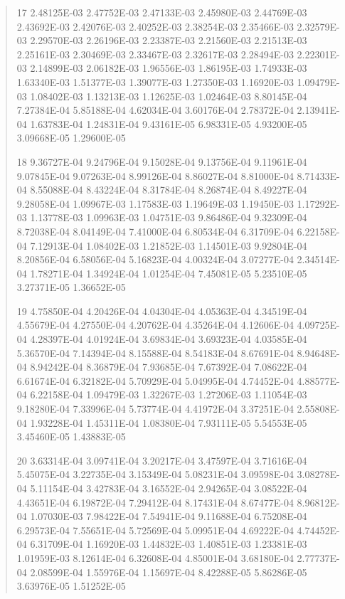 \documentclass[letterpaper,10pt,english]{sphinxmanual}
\begin{document}
\begin{quote}
\begin{DUlineblock}{0em}
\item[] 17   2.48125E-03  2.47752E-03  2.47133E-03  2.45980E-03  2.44769E-03  2.43692E-03  2.42076E-03  2.40252E-03  2.38254E-03  2.35466E-03  2.32579E-03  2.29570E-03  2.26196E-03  2.23387E-03  2.21560E-03  2.21513E-03  2.25161E-03  2.30469E-03  2.33467E-03  2.32617E-03  2.28494E-03  2.22301E-03  2.14899E-03  2.06182E-03  1.96556E-03  1.86195E-03  1.74933E-03  1.63340E-03  1.51377E-03  1.39077E-03  1.27350E-03  1.16920E-03  1.09479E-03  1.08402E-03  1.13213E-03  1.12625E-03  1.02464E-03  8.80145E-04  7.27384E-04  5.85188E-04  4.62034E-04  3.60176E-04  2.78372E-04  2.13941E-04  1.63783E-04  1.24831E-04  9.43161E-05  6.98331E-05  4.93200E-05  3.09668E-05  1.29600E-05
\item[] 18   9.36727E-04  9.24796E-04  9.15028E-04  9.13756E-04  9.11961E-04  9.07845E-04  9.07263E-04  8.99126E-04  8.86027E-04  8.81000E-04  8.71433E-04  8.55088E-04  8.43224E-04  8.31784E-04  8.26874E-04  8.49227E-04  9.28058E-04  1.09967E-03  1.17583E-03  1.19649E-03  1.19450E-03  1.17292E-03  1.13778E-03  1.09963E-03  1.04751E-03  9.86486E-04  9.32309E-04  8.72038E-04  8.04149E-04  7.41000E-04  6.80534E-04  6.31709E-04  6.22158E-04  7.12913E-04  1.08402E-03  1.21852E-03  1.14501E-03  9.92804E-04  8.20856E-04  6.58056E-04  5.16823E-04  4.00324E-04  3.07277E-04  2.34514E-04  1.78271E-04  1.34924E-04  1.01254E-04  7.45081E-05  5.23510E-05  3.27371E-05  1.36652E-05
\item[] 19   4.75850E-04  4.20426E-04  4.04304E-04  4.05363E-04  4.34519E-04  4.55679E-04  4.27550E-04  4.20762E-04  4.35264E-04  4.12606E-04  4.09725E-04  4.28397E-04  4.01924E-04  3.69834E-04  3.69323E-04  4.03585E-04  5.36570E-04  7.14394E-04  8.15588E-04  8.54183E-04  8.67691E-04  8.94648E-04  8.94242E-04  8.36879E-04  7.93685E-04  7.67392E-04  7.08622E-04  6.61674E-04  6.32182E-04  5.70929E-04  5.04995E-04  4.74452E-04  4.88577E-04  6.22158E-04  1.09479E-03  1.32267E-03  1.27206E-03  1.11054E-03  9.18280E-04  7.33996E-04  5.73774E-04  4.41972E-04  3.37251E-04  2.55808E-04  1.93228E-04  1.45311E-04  1.08380E-04  7.93111E-05  5.54553E-05  3.45460E-05  1.43883E-05
\item[] 20   3.63314E-04  3.09741E-04  3.20217E-04  3.47597E-04  3.71616E-04  5.45075E-04  3.22735E-04  3.15349E-04  5.08231E-04  3.09598E-04  3.08278E-04  5.11154E-04  3.42783E-04  3.16552E-04  2.94265E-04  3.08522E-04  4.43651E-04  6.19872E-04  7.29412E-04  8.17431E-04  8.67477E-04  8.96812E-04  1.07030E-03  7.98422E-04  7.54941E-04  9.11688E-04  6.75208E-04  6.29573E-04  7.55651E-04  5.72569E-04  5.09951E-04  4.69222E-04  4.74452E-04  6.31709E-04  1.16920E-03  1.44832E-03  1.40851E-03  1.23381E-03  1.01959E-03  8.12614E-04  6.32608E-04  4.85001E-04  3.68180E-04  2.77737E-04  2.08599E-04  1.55976E-04  1.15697E-04  8.42288E-05  5.86286E-05  3.63976E-05  1.51252E-05

\end{DUlineblock}
\end{quote}
\end{document}
